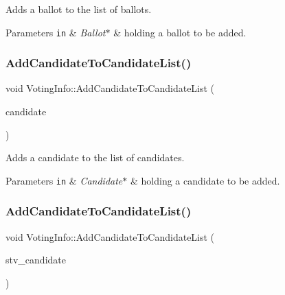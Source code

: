 Adds a ballot to the list of ballots. 


\begin{DoxyParams}[1]{Parameters}
\mbox{\tt in}  & {\em Ballot$\ast$} & holding a ballot to be added. \\
\hline
\end{DoxyParams}
\mbox{\label{classVotingInfo_ac0ab5f83a06ea6721999addb43a581ea}} 
\subsubsection{\texorpdfstring{Add\+Candidate\+To\+Candidate\+List()}{AddCandidateToCandidateList()}\hspace{0.1cm}{\footnotesize\ttfamily [1/2]}}
{\footnotesize\ttfamily void Voting\+Info\+::\+Add\+Candidate\+To\+Candidate\+List (\begin{DoxyParamCaption}\item[{\hyperlink{classCandidate}{Candidate} $\ast$}]{candidate }\end{DoxyParamCaption})}



Adds a candidate to the list of candidates. 


\begin{DoxyParams}[1]{Parameters}
\mbox{\tt in}  & {\em Candidate$\ast$} & holding a candidate to be added. \\
\hline
\end{DoxyParams}
\mbox{\label{classVotingInfo_a18d8dfef16797ef988a296d5ef28c852}} 
\subsubsection{\texorpdfstring{Add\+Candidate\+To\+Candidate\+List()}{AddCandidateToCandidateList()}\hspace{0.1cm}{\footnotesize\ttfamily [2/2]}}
{\footnotesize\ttfamily void Voting\+Info\+::\+Add\+Candidate\+To\+Candidate\+List (\begin{DoxyParamCaption}\item[{\hyperlink{classSTVCandidate}{S\+T\+V\+Candidate} $\ast$}]{stv\+\_\+candidate }\end{DoxyParamCaption})}




